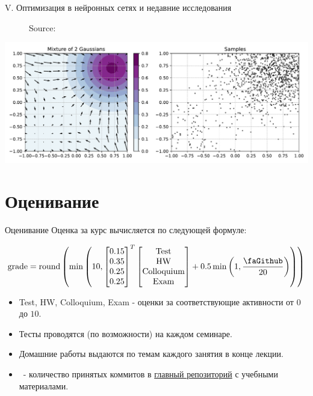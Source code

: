 \documentclass[9pt, aspectratio=169]{beamer}
\begin{document}
\begin{frame}{V. Оптимизация в нейронных сетях и недавние исследования}
\begin{minipage}{0.382\textwidth}
\begin{figure}
            \caption{Source: \cite{belkin2019reconciling}}
        \end{figure}
        \centering
        \includegraphics[width=\linewidth]{diff.pdf}
    \end{minipage}
\end{frame}

\section{Оценивание}
\begin{frame}{Оценивание}
    Оценка за курс вычисляется по следующей формуле:

    $$
    \text{grade} = \text{round}\left(\min\left(10, \begin{bmatrix}
        0.15 \\ 0.35 \\ 0.25 \\ 0.25
    \end{bmatrix}^T \begin{bmatrix}
        \text{Test} \\ \text{HW} \\ \text{Colloquium} \\ \text{Exam}
    \end{bmatrix} + 0.5\min \left(1, \dfrac{\text{\faGithub}}{20}\right)\right)\right)
    $$

    \begin{itemize}
        \item Test, HW, Colloquium, Exam - оценки за соответствующие активности от $0$ до $10$.
        \item Тесты проводятся (по возможности) на каждом семинаре.
        \item Домашние работы выдаются по темам каждого занятия в конце лекции.
        \item \faGithub~- количество принятых коммитов в \href{https://github.com/MerkulovDaniil/optim}{главный репозиторий} с учебными материалами.
    \end{itemize}
    
\end{frame}
\end{document}
